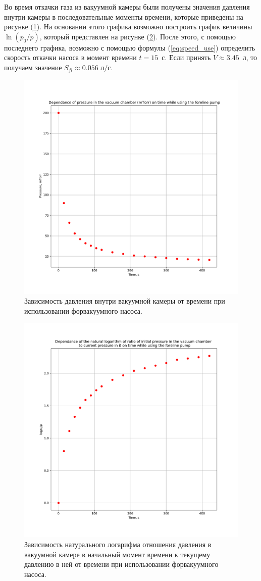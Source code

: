 \documentclass[a4paper, 12pt]{article}
\begin{document}
Во время откачки газа из вакуумной камеры были получены значения давления внутри камеры в последовательные моменты времени, которые приведены на рисунке (\ref{fig:oil_p}). На основании этого графика возможно построить график величины $\ln (p_0/p)$, который представлен на рисунке (\ref{fig:oil_ln}). После этого, с помощью последнего графика, возможно с помощью формулы (\ref{eq:speed_use}) определить скорость откачки насоса в момент времени $t=15$~с. Если принять $V\approx 3.45$~л, то получаем значение $\boxed{S_{fl} \approx 0.056\text{ л/с}}$.

\begin{figure}[h]
	\centering
	\includegraphics[width=0.8\linewidth]{lab_1_oil_p}
	\caption{Зависимость давления внутри вакуумной камеры от времени при использовании форвакуумного насоса.}
	\label{fig:oil_p}
\end{figure}

\begin{figure}[h]
	\centering
	\includegraphics[width=0.8\linewidth]{lab_1_oil_ln}
	\caption{Зависимость натурального логарифма отношения давления в вакуумной камере в начальный момент времени к текущему давлению в ней от времени при использовании форвакуумного насоса.}
	\label{fig:oil_ln}
\end{figure}
\end{document}
